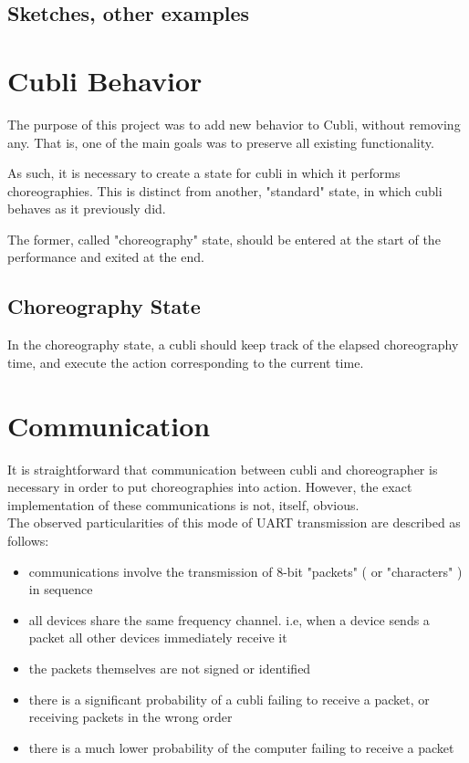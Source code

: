 \subsection{Sketches, other examples}

\section{Cubli Behavior}

The purpose of this project was to add new behavior to Cubli, without removing any. That is, one of the main goals was to preserve all existing functionality.

As such, it is necessary to create a state for cubli in which it performs choreographies. This is distinct from another, "standard" state, in which cubli behaves as it previously did.

The former, called "choreography" state, should be entered at the start of the performance and exited at the end.

\subsection{Choreography State}

In the choreography state, a cubli should keep track of the elapsed choreography time, and execute the action corresponding to the current time.

\section{Communication}

It is straightforward that communication between cubli and choreographer is necessary in order to put choreographies into action. However, the exact implementation of these communications is not, itself, obvious.\\

The observed particularities of this mode of UART transmission are described as follows:
\begin{itemize}
\item communications involve the transmission of 8-bit "packets" ( or "characters" ) in sequence
\item all devices share the same frequency channel. i.e, when a device sends a packet all other devices immediately receive it
\item the packets themselves are not signed or identified
\item there is a significant probability of a cubli failing to receive a packet, or receiving packets in the wrong order
\item there is a much lower probability of the computer failing to receive a packet
\end{itemize}

